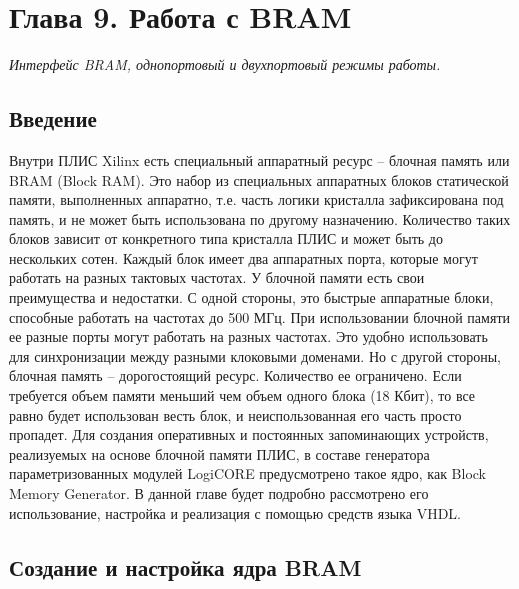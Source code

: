 \chapter*{Глава 9. Работа с BRAM}

\emph{Интерфейс BRAM, однопортовый и двухпортовый режимы работы.}

\section{Введение}

Внутри ПЛИС Xilinx есть специальный аппаратный ресурс – блочная память или BRAM (Block RAM). Это набор из специальных аппаратных блоков статической памяти, выполненных аппаратно, т.е. часть логики кристалла зафиксирована под память, и не может быть использована по другому назначению. Количество таких блоков зависит от конкретного типа кристалла ПЛИС и может быть до нескольких сотен. Каждый блок имеет два аппаратных порта, которые могут работать на разных тактовых частотах. 
У блочной памяти есть свои преимущества и недостатки. С одной стороны, это быстрые аппаратные блоки, способные работать на частотах до 500 МГц. При использовании блочной памяти ее разные порты могут работать на разных частотах. Это удобно использовать для синхронизации между разными клоковыми доменами. Но с другой стороны, блочная память – дорогостоящий ресурс. Количество ее ограничено. Если требуется объем памяти меньший чем объем одного блока (18 Кбит), то все равно будет использован весть блок, и неиспользованная его часть просто пропадет. 
Для создания оперативных и постоянных запоминающих устройств, реализуемых на основе блочной памяти ПЛИС, в составе генератора параметризованных модулей LogiCORE предусмотрено такое ядро, как Block Memory Generator. В данной главе будет подробно рассмотрено его использование, настройка и реализация с помощью средств языка VHDL.

\section{Создание и настройка ядра BRAM}

